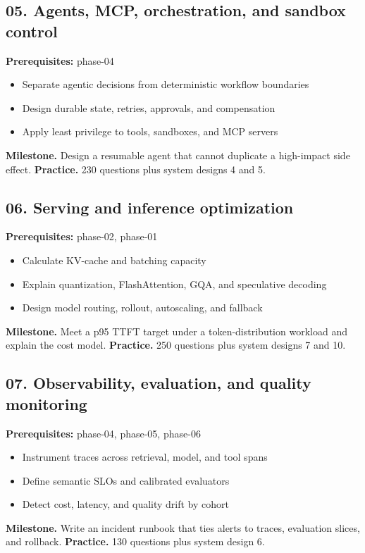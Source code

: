 \subsection{05. Agents, MCP, orchestration, and sandbox control}
 \quad \textbf{Prerequisites:} phase-04
\begin{itemize}
\item Separate agentic decisions from deterministic workflow boundaries
\item Design durable state, retries, approvals, and compensation
\item Apply least privilege to tools, sandboxes, and MCP servers
\end{itemize}
\textbf{Milestone.} Design a resumable agent that cannot duplicate a high-impact side effect.
\textbf{Practice.} 230 questions plus system designs 4 and 5.
\subsection{06. Serving and inference optimization}
 \quad \textbf{Prerequisites:} phase-02, phase-01
\begin{itemize}
\item Calculate KV-cache and batching capacity
\item Explain quantization, FlashAttention, GQA, and speculative decoding
\item Design model routing, rollout, autoscaling, and fallback
\end{itemize}
\textbf{Milestone.} Meet a p95 TTFT target under a token-distribution workload and explain the cost model.
\textbf{Practice.} 250 questions plus system designs 7 and 10.
\subsection{07. Observability, evaluation, and quality monitoring}
 \quad \textbf{Prerequisites:} phase-04, phase-05, phase-06
\begin{itemize}
\item Instrument traces across retrieval, model, and tool spans
\item Define semantic SLOs and calibrated evaluators
\item Detect cost, latency, and quality drift by cohort
\end{itemize}
\textbf{Milestone.} Write an incident runbook that ties alerts to traces, evaluation slices, and rollback.
\textbf{Practice.} 130 questions plus system design 6.
